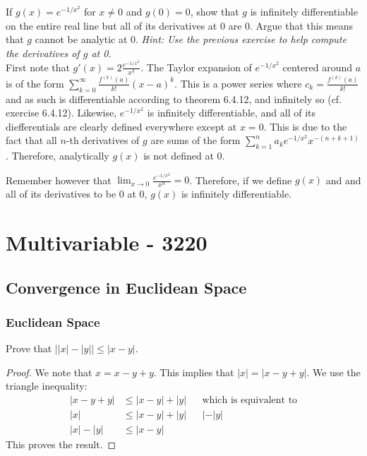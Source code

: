 \documentclass[12pt]{book}
\newenvironment{exercise}[2][Exercise]{\begin{trivlist}
\item[\hskip \labelsep {\bfseries #1}\hskip \labelsep {\bfseries #2.}]}{\end{trivlist}}
\begin{document}
\begin{exercise}{6.5.13}
If $g(x)=e^{-1/x^2}$ for $x \neq 0$ and $g(0)=0$, show that $g$ is infinitely differentiable on the entire real line but all of its derivatives at 0 are 0. Argue that this means that $g$ cannot be analytic at 0. \emph{Hint: Use the previous exercise to help compute the derivatives of $g$ at 0.} \\

First note that $g'(x)= 2 \frac{e^{-1/x^2}}{x^3}$. The Taylor expansion of $e^{-1/x^2}$ centered around $a$ is of the form $\sum_{k=0}^\infty \frac{f^{(k)}(a)}{k!} \left(x-a\right)^k$. This is a power series where $c_k=\frac{f^{(k)}(a)}{k!}$ and as such is differentiable according to theorem 6.4.12, and infinitely so (cf. exercise 6.4.12). Likewise, $e^{-1/x^2}$ is infinitely differentiable, and all of its diefferentials are clearly defined everywhere except at $x=0$. This is due to the fact that all $n$-th derivatives of $g$ are sums of the form $\sum_{k=1}^n a_k e^{-1/x^2} x^{-(n+k+1)}$. Therefore, analytically $g(x)$ is not defined at 0.

Remember however that $\lim_{x \to 0} \frac{e^{-1/x^2}}{x^n}=0$. Therefore, if we define $g(x)$ and and all of its derivatives to be 0 at 0, $g(x)$ is infinitely differentiable.
\end{exercise}



\part{Multivariable - 3220}




\chapter{Convergence in Euclidean Space}
\section{Euclidean Space}


\begin{exercise}{7.1.5}
Prove that $\left| |x| - |y| \right| \leq \left| x- y \right|$.

    \begin{proof}
    We note that $x = x-y+y$. This implies that $\left|x\right| = \left| x - y + y\right| $. We use the triangle inequality:\
        \begin{align*}
        \left| x - y + y \right| &\leq \left|x-y\right| + |y| &&\text{which is equivalent to}\\
        \left| x \right| &\leq \left|x-y\right| + |y| &&| - |y| \\
        \left| x \right| - \left| y \right| &\leq \left| x- y \right|
        \end{align*}
    This proves the result.
    \end{proof}
\end{exercise}
\end{document}
